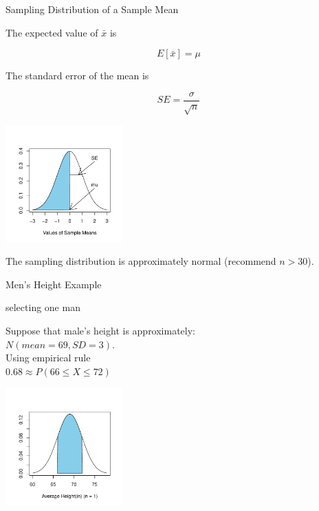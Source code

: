 \documentclass[14pt]{beamer}\usepackage[]{graphicx}\usepackage[]{color}
\begin{document}
\begin{frame}[fragile]{Sampling Distribution of a Sample Mean}

\begin{minipage}[ht]{5cm}

{\small{
The expected value of $\bar{x}$ is 
}}

$$ E[\bar{x}] = \mu $$

{\footnotesize{
The standard error of the mean is
}}

$$ SE = \frac{ \sigma}{ \sqrt{n}} $$

\end{minipage} \hfill
\begin{minipage}[ht]{5cm}


\includegraphics[width=4.5cm]{figure/LBL10a-1} 


\end{minipage}

The sampling distribution is approximately normal (recommend $n > 30$). 

\end{frame}

\begin{frame}[fragile]{Men's Height Example}

\begin{minipage}[ht]{5cm}

selecting one man

{\small{
Suppose that male's height is approximately: \\
$N(mean = 69, SD = 3)$. \\
Using empirical rule \\
$0.68 \approx P(66 \le X \le 72)$
}}
\end{minipage} \hfill
\begin{minipage}[ht]{5cm}


\includegraphics[width=4.5cm]{figure/LBL10b-1} 


\end{minipage}
\end{frame}
\end{document}
